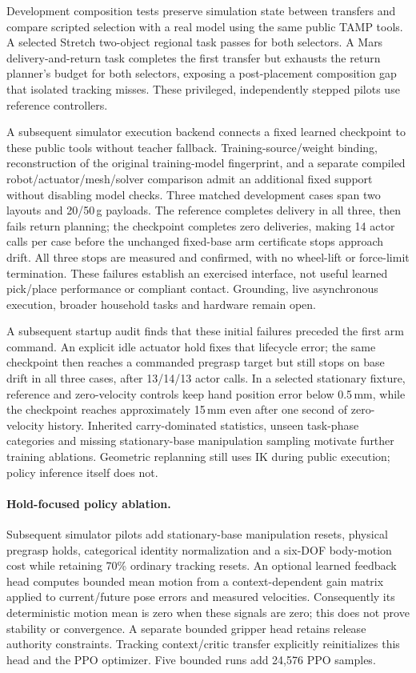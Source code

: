 Development composition tests preserve simulation state between transfers and
compare scripted selection with a real model using the same public TAMP tools.
A selected Stretch two-object regional task passes for both selectors. A Mars
delivery-and-return task completes the first transfer but exhausts the return
planner's budget for both selectors, exposing a post-placement composition gap
that isolated tracking misses. These privileged, independently stepped pilots
use reference controllers.

A subsequent simulator execution backend connects a fixed learned checkpoint
to these public tools without teacher fallback. Training-source/weight binding,
reconstruction of the original training-model fingerprint, and a separate
compiled robot/actuator/mesh/solver comparison admit an additional fixed support
without disabling model checks. Three matched development cases span two
layouts and 20/50\,g payloads. The reference completes delivery in all three,
then fails return planning; the checkpoint completes zero deliveries, making
14 actor calls per case before the unchanged fixed-base arm certificate stops
approach drift. All three stops are measured and confirmed, with no wheel-lift
or force-limit termination. These failures establish an exercised interface,
not useful learned pick/place performance or compliant contact. Grounding,
live asynchronous execution, broader household tasks and hardware remain open.

A subsequent startup audit finds that these initial failures preceded the first
arm command. An explicit idle actuator hold fixes that lifecycle error; the
same checkpoint then reaches a commanded pregrasp target but still stops on
base drift in all three cases, after 13/14/13 actor calls. In a selected
stationary fixture, reference and zero-velocity controls keep hand position
error below 0.5\,mm, while the checkpoint reaches approximately 15\,mm even
after one second of zero-velocity history. Inherited carry-dominated statistics,
unseen task-phase categories and missing stationary-base manipulation sampling
motivate further training ablations. Geometric replanning still uses IK during
public execution; policy inference itself does not.

\paragraph{Hold-focused policy ablation.}
Subsequent simulator pilots add stationary-base manipulation resets, physical
pregrasp holds, categorical identity normalization and a six-DOF body-motion
cost while retaining 70\% ordinary tracking resets. An optional learned
feedback head computes bounded mean motion from a context-dependent gain matrix
applied to current/future pose errors and measured velocities. Consequently its
deterministic motion mean is zero when these signals are zero; this does not
prove stability or convergence. A separate bounded gripper head retains release
authority constraints. Tracking context/critic transfer explicitly reinitializes
this head and the PPO optimizer. Five bounded runs add 24,576 PPO samples.

